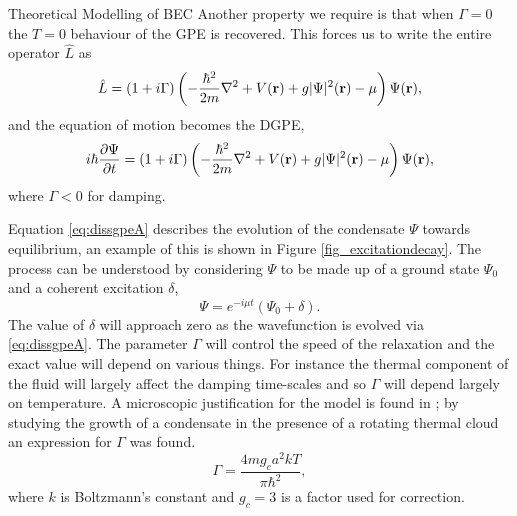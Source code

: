 \begin{chapter}{\label{cha:theoretical_model}Theoretical Modelling of BEC}
	Another property we require is that when $\Gamma=0$ the $T=0$ behaviour of the GPE is recovered. This forces us to write the entire operator $\hat{L}$ as
	\begin{equation*}\label{eq:dissantiherm2}
		\hat{L} = (1+i\Gamma)\left( -\frac{\hbar^2}{2m}\nabla^2 + V({\bf r}) + g|\Psi|^2({\bf r}) - \mu \right) \Psi({\bf r}),
	\end{equation*}
	and the equation of motion becomes the DGPE,
	\begin{equation}\label{eq:dissgpeA}
		i\hbar \frac{\partial \Psi}{\partial t} = (1+i\Gamma)\left( -\frac{\hbar^2 }{2m}\nabla^2 + V({\bf r}) + g|\Psi|^2({\bf r}) - \mu \right) \Psi({\bf r}),
	\end{equation}
	where $\Gamma<0$ for damping.

	Equation \ref{eq:dissgpeA} describes the evolution of the condensate $\Psi$ towards equilibrium, an example of this is shown in Figure \ref{fig_excitationdecay}. The process can be understood by considering $\Psi$ to be made up of a ground state $\Psi_0$ and a coherent excitation $\delta$,
	\begin{equation*}\label{eq:dissantiherm2}
		\Psi = e^{-i \mu t}(\Psi_0 + \delta).
	\end{equation*}
	The value of $\delta$ will approach zero as the wavefunction is evolved via \ref{eq:dissgpeA}. The parameter $\Gamma$ will control the speed of the relaxation and the exact value will depend on various things. For instance the thermal component of the fluid will largely affect the damping time-scales and so $\Gamma$ will depend largely on temperature. A microscopic justification for the model is found in \cite{penckwitt_2002, gardiner97}; by studying the growth of a condensate in the presence of a rotating thermal cloud an expression for $\Gamma$ was found.
		\begin{equation}\label{eq:dissgamma}
		\Gamma = \frac{4mg_ca^2kT}{\pi\hbar^2},
		\end{equation}
	where $k$ is Boltzmann's constant and $g_c = 3$ is a factor used for correction.
\begin{figure}[!ht]
	\centering
   \begin{tikzpicture}

\end{tikzpicture}
\end{figure}
\end{chapter}
